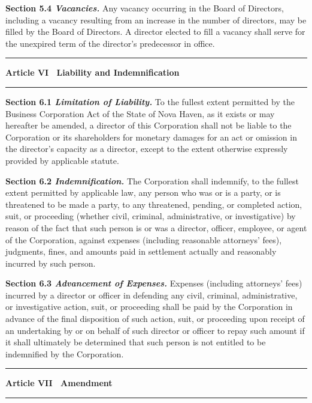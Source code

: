 \documentclass[12pt,a4paper]{scrartcl}
\newcommand{\articletitle}[1]{%
  \par\vspace{4pt}\noindent%
  {\color{GoldAccent}\rule{\linewidth}{1.2pt}}\par\vspace{2pt}\noindent%
  {\large\bfseries\color{NavyDeep}#1}\par\vspace{4pt}\noindent%
  {\color{RuleGray}\rule{\linewidth}{0.4pt}}\par\vspace{6pt}\noindent%
}
\newcommand{\sectionlabel}[1]{%
  \noindent\textbf{\color{NavyDeep}#1}\quad%
}
\begin{document}
\sectionlabel{Section 5.4 \textit{Vacancies.}}Any vacancy occurring in the Board of Directors,
including a vacancy resulting from an increase in the number of directors, may be filled by
the Board of Directors. A director elected to fill a vacancy shall serve for the unexpired
term of the director's predecessor in office.

\articletitle{Article VI \textemdash\ Liability and Indemnification}

\sectionlabel{Section 6.1 \textit{Limitation of Liability.}}To the fullest extent permitted
by the Business Corporation Act of the State of Nova Haven, as it exists or may hereafter be
amended, a director of this Corporation shall not be liable to the Corporation or its
shareholders for monetary damages for an act or omission in the director's capacity as a
director, except to the extent otherwise expressly provided by applicable statute.

\sectionlabel{Section 6.2 \textit{Indemnification.}}The Corporation shall indemnify, to the
fullest extent permitted by applicable law, any person who was or is a party, or is threatened
to be made a party, to any threatened, pending, or completed action, suit, or proceeding
(whether civil, criminal, administrative, or investigative) by reason of the fact that such
person is or was a director, officer, employee, or agent of the Corporation, against expenses
(including reasonable attorneys' fees), judgments, fines, and amounts paid in settlement
actually and reasonably incurred by such person.

\sectionlabel{Section 6.3 \textit{Advancement of Expenses.}}Expenses (including attorneys'
fees) incurred by a director or officer in defending any civil, criminal, administrative, or
investigative action, suit, or proceeding shall be paid by the Corporation in advance of the
final disposition of such action, suit, or proceeding upon receipt of an undertaking by or on
behalf of such director or officer to repay such amount if it shall ultimately be determined
that such person is not entitled to be indemnified by the Corporation.

\articletitle{Article VII \textemdash\ Amendment}
\end{document}
